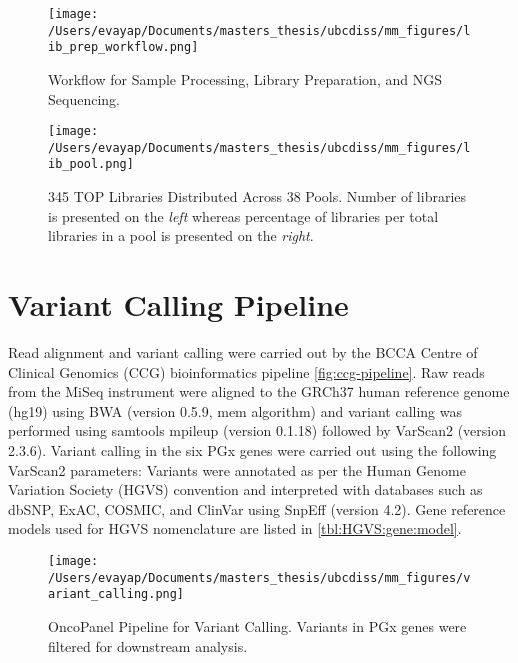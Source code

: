 \begin{figure}
    \centering
    \texttt{[image: /Users/evayap/Documents/masters\_thesis/ubcdiss/mm\_figures/lib\_prep\_workflow.png]}
    \caption{Workflow for Sample Processing, Library Preparation, and NGS Sequencing.}
    \label{fig:lib-prep-workflow}   %
\end{figure}

\begin{figure}
    \centering
    \texttt{[image: /Users/evayap/Documents/masters\_thesis/ubcdiss/mm\_figures/lib\_pool.png]}
    \caption{345 TOP Libraries Distributed Across 38 Pools. Number of libraries is presented on the \textit{left} whereas percentage of libraries per total libraries in a pool is presented on the \textit{right}.}
    \label{fig:lib-pooling}   %
\end{figure}

\section{Variant Calling Pipeline}
\label{sec:VariantCallingPipeline}

Read alignment and variant calling were carried out by the BCCA Centre of Clinical Genomics (CCG) bioinformatics pipeline \autoref{fig:ccg-pipeline}. Raw reads from the MiSeq instrument were aligned to the GRCh37 human reference genome (hg19) using BWA (version 0.5.9, mem algorithm) and variant calling was performed using samtools mpileup (version 0.1.18) followed by VarScan2 (version 2.3.6). Variant calling in the six PGx genes were carried out using the following VarScan2 parameters: Variants were annotated as per the Human Genome Variation Society (HGVS) convention and interpreted with databases such as dbSNP, ExAC, COSMIC, and ClinVar using SnpEff (version 4.2). Gene reference models used for HGVS nomenclature are listed in \autoref{tbl:HGVS:gene:model}.

\begin{figure}
    \centering
    \texttt{[image: /Users/evayap/Documents/masters\_thesis/ubcdiss/mm\_figures/variant\_calling.png]}
    \caption[
      OncoPanel Pipeline for Variant Calling.
    ]{
      OncoPanel Pipeline for Variant Calling. Variants in PGx genes were filtered for downstream analysis.
      }
    \label{fig:ccg-pipeline}   %
\end{figure}

